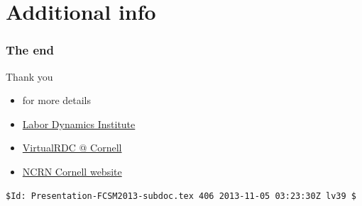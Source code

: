 \section*{Additional info}
\begin{slide}
\frametitle{The end}
\begin{block}{Thank you}
\begin{itemize}
\item \cite{AbowdVilhuberBlock2012} for more details
\item \href{http://www.ilr.cornell.edu/LDI/}{Labor Dynamics Institute}
\item \href{http://www.vrdc.cornell.edu}{VirtualRDC @ Cornell}
\item \href{http://www.ncrn.cornell.edu/}{NCRN Cornell website}
\end{itemize}
\end{block}
\end{slide}

\begin{frame}[fragile]
\begin{verbatim}
$Id: Presentation-FCSM2013-subdoc.tex 406 2013-11-05 03:23:30Z lv39 $
\end{verbatim}
\end{frame}

